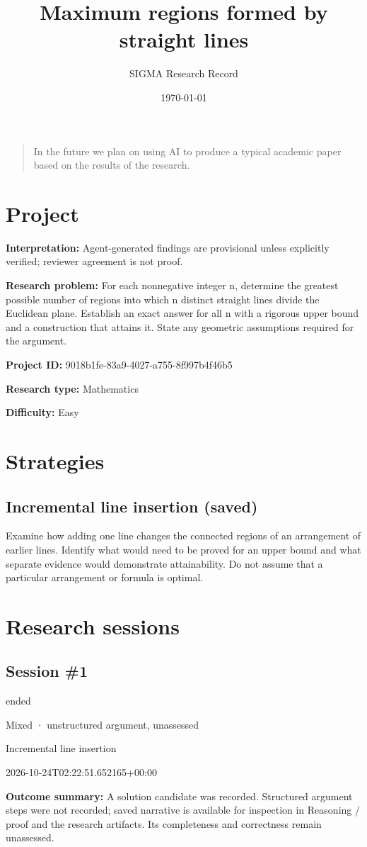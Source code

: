 \documentclass[11pt]{article}
\title{Maximum regions formed by straight lines}
\author{SIGMA Research Record}
\date{\today}
\begin{document}
\maketitle
\begin{quote}\small In the future we plan on using AI to produce a typical academic paper based on the results of the research.\end{quote}
\section{Project}
\textbf{Interpretation:} Agent-generated findings are provisional unless explicitly verified; reviewer agreement is not proof.\par
\textbf{Research problem:} For each nonnegative integer n, determine the greatest possible number of regions into which n distinct straight lines divide the Euclidean plane. Establish an exact answer for all n with a rigorous upper bound and a construction that attains it. State any geometric assumptions required for the argument.\par
\textbf{Project ID:} 9018b1fe-83a9-4027-a755-8f997b4f46b5\par
\textbf{Research type:} Mathematics\par
\textbf{Difficulty:} Easy\par
\section{Strategies}
\subsection{Incremental line insertion (saved)}
Examine how adding one line changes the connected regions of an arrangement of earlier lines. Identify what would need to be proved for an upper bound and what separate evidence would demonstrate attainability. Do not assume that a particular arrangement or formula is optimal.\par
\section{Research sessions}
\subsection{Session \#1}
\begin{description}[style=nextline,font=\normalfont\bfseries,leftmargin=0pt,labelsep=0pt]
\item[Execution status] ended
\item[Outcome] Mixed · unstructured argument, unassessed
\item[Strategy] Incremental line insertion
\item[Started] 2026-10-24T02:22:51.652165+00:00
\end{description}
\textbf{Outcome summary:} A solution candidate was recorded. Structured argument steps were not recorded; saved narrative is available for inspection in Reasoning / proof and the research artifacts. Its completeness and correctness remain unassessed.\par
\end{document}
